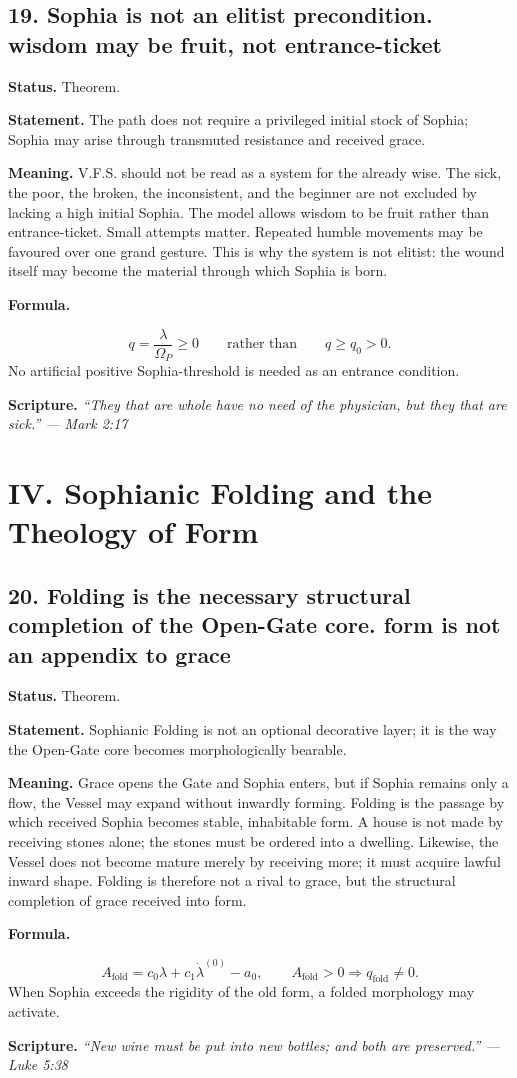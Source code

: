 \documentclass[11pt]{article}
\newcommand{\Op}{\Omega_P}
\newcommand{\qfold}{q_{\mathrm{fold}}}
\newcommand{\Afold}{A_{\mathrm{fold}}}
\newcommand{\thesis}[2]{%
  \subsection*{#1. #2}%
}
\newcommand{\status}[1]{\textbf{Status.} #1\par}
\newcommand{\statement}[1]{\textbf{Statement.} #1\par}
\newcommand{\explain}[1]{\textbf{Meaning.} #1\par}
\newcommand{\formula}[1]{\textbf{Formula.}\par #1\par}
\newcommand{\scripture}[2]{\textbf{Scripture.} {\small\itshape ``#1'' --- #2}\par}
\begin{document}
\thesis{19}{Sophia is not an elitist precondition. wisdom may be fruit, not entrance-ticket}
\status{Theorem.}
\statement{The path does not require a privileged initial stock of Sophia; Sophia may arise through transmuted resistance and received grace.}
\explain{V.F.S. should not be read as a system for the already wise. The sick, the poor, the broken, the inconsistent, and the beginner are not excluded by lacking a high initial Sophia. The model allows wisdom to be fruit rather than entrance-ticket. Small attempts matter. Repeated humble movements may be favoured over one grand gesture. This is why the system is not elitist: the wound itself may become the material through which Sophia is born.}
\formula{\[
  q=\frac{\lambda}{\Op}\ge0
  \qquad\text{rather than}\qquad
  q\ge q_0>0.
\]
No artificial positive Sophia-threshold is needed as an entrance condition.}
\scripture{They that are whole have no need of the physician, but they that are sick.}{Mark 2:17}

\section{IV. Sophianic Folding and the Theology of Form}

\thesis{20}{Folding is the necessary structural completion of the Open-Gate core. form is not an appendix to grace}
\status{Theorem.}
\statement{Sophianic Folding is not an optional decorative layer; it is the way the Open-Gate core becomes morphologically bearable.}
\explain{Grace opens the Gate and Sophia enters, but if Sophia remains only a flow, the Vessel may expand without inwardly forming. Folding is the passage by which received Sophia becomes stable, inhabitable form. A house is not made by receiving stones alone; the stones must be ordered into a dwelling. Likewise, the Vessel does not become mature merely by receiving more; it must acquire lawful inward shape. Folding is therefore not a rival to grace, but the structural completion of grace received into form.}
\formula{\[
  \Afold=c_0\lambda+c_1\dot\lambda^{(0)}-a_0,
  \qquad
  \Afold>0\Rightarrow \qfold\ne0.
\]
When Sophia exceeds the rigidity of the old form, a folded morphology may activate.}
\scripture{New wine must be put into new bottles; and both are preserved.}{Luke 5:38}
\end{document}
